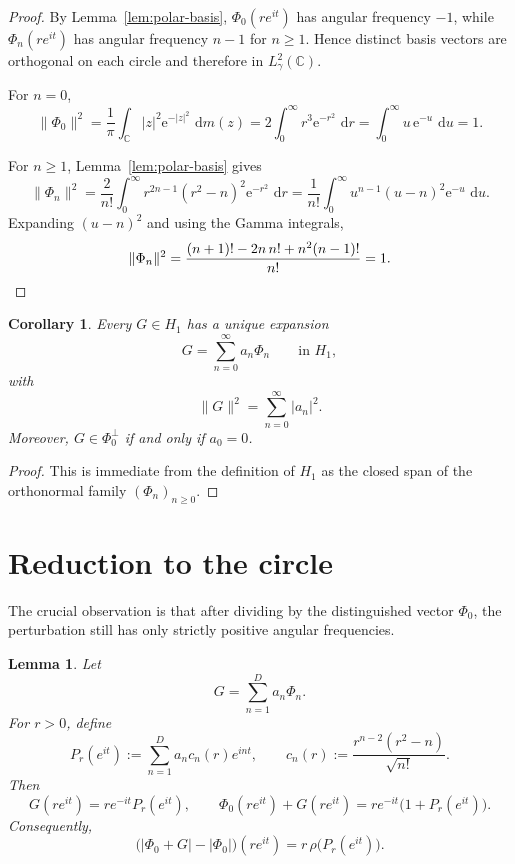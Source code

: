 \documentclass[11pt]{amsart}
\newtheorem{lemma}[theorem]{Lemma}
\newtheorem{corollary}[theorem]{Corollary}
\theoremstyle{remark}
\newcommand{\C}{\mathbb{C}}
\newcommand{\abs}[1]{\lvert #1 \rvert}
\newcommand{\norm}[1]{\lVert #1 \rVert}
\newcommand{\dd}{\,\mathrm{d}}
\newcommand{\ee}{\mathrm{e}}
\newcommand{\rhoFn}{\rho}
\begin{document}
\begin{proof}
By Lemma~\ref{lem:polar-basis}, $\Phi_0(re^{it})$ has angular frequency $-1$,
while $\Phi_n(re^{it})$ has angular frequency $n-1$ for $n \ge 1$. Hence
distinct basis vectors are orthogonal on each circle and therefore in
$L^2_\gamma(\C)$.

For $n=0$,
\[
\norm{\Phi_0}^2
=
\frac1\pi \int_\C \abs{z}^2 \ee^{-\abs{z}^2}\,\dd m(z)
=
2\int_0^\infty r^3 \ee^{-r^2}\,\dd r
=
\int_0^\infty u\,\ee^{-u}\,\dd u
=
1.
\]

For $n \ge 1$, Lemma~\ref{lem:polar-basis} gives
\[
\norm{\Phi_n}^2
=
\frac{2}{n!}\int_0^\infty r^{2n-1}(r^2-n)^2 \ee^{-r^2}\,\dd r
=
\frac{1}{n!}\int_0^\infty u^{n-1}(u-n)^2 \ee^{-u}\,\dd u.
\]
Expanding $(u-n)^2$ and using the Gamma integrals,
\[
\norm{\Phi_n}^2
=
\frac{(n+1)! - 2n\,n! + n^2 (n-1)!}{n!}
=
1.
\qedhere
\]
\end{proof}

\begin{corollary}\label{cor:expansion}
Every $G \in H_1$ has a unique expansion
\[
G = \sum_{n=0}^\infty a_n \Phi_n
\qquad \text{in } H_1,
\]
with
\[
\norm{G}^2 = \sum_{n=0}^\infty \abs{a_n}^2.
\]
Moreover, $G \in \Phi_0^\perp$ if and only if $a_0=0$.
\end{corollary}

\begin{proof}
This is immediate from the definition of $H_1$ as the closed span of the
orthonormal family $(\Phi_n)_{n\ge0}$.
\end{proof}

\section{Reduction to the circle}

The crucial observation is that after dividing by the distinguished vector
$\Phi_0$, the perturbation still has only strictly positive angular
frequencies.

\begin{lemma}\label{lem:circle-reduction}
Let
\[
G = \sum_{n=1}^D a_n \Phi_n.
\]
For $r>0$, define
\[
P_r(e^{it})
:=
\sum_{n=1}^D a_n c_n(r)e^{int},
\qquad
c_n(r) := \frac{r^{n-2}(r^2-n)}{\sqrt{n!}}.
\]
Then
\[
G(re^{it}) = r e^{-it} P_r(e^{it}),
\qquad
\Phi_0(re^{it}) + G(re^{it}) = r e^{-it}\bigl(1 + P_r(e^{it})\bigr).
\]
Consequently,
\[
\bigl(\abs{\Phi_0 + G} - \abs{\Phi_0}\bigr)(re^{it})
=
r\,\rhoFn\bigl(P_r(e^{it})\bigr).
\]
\end{lemma}
\end{document}
